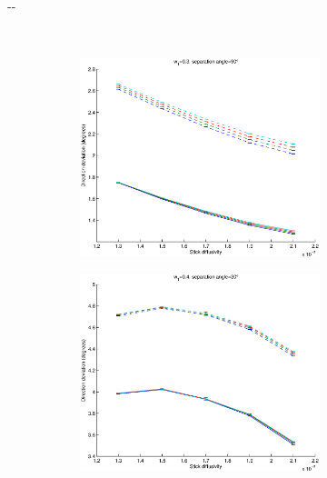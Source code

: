 \documentclass{article}
\begin{document}
\begin{figure}[H]
\begin{adjustwidth}{-\oddsidemargin}{-\rightmargin}
\begin{subfigure}{0.8\paperwidth}
      ~
      \begin{subfigure}{0.3\textwidth}
        \centering
        \includegraphics[width=\textwidth]{figures/synth_bas_diffus__snr=20__w1=3__angle=90.eps}
      \end{subfigure}
    \end{subfigure}
    \begin{subfigure}{0.8\paperwidth}
      \begin{subfigure}{0.3\textwidth}
        \centering
        \includegraphics[width=\textwidth]{figures/synth_bas_diffus__snr=20__w1=4__angle=30.eps}

\end{subfigure}
\end{subfigure}
\end{adjustwidth}
\end{figure}
\end{document}
